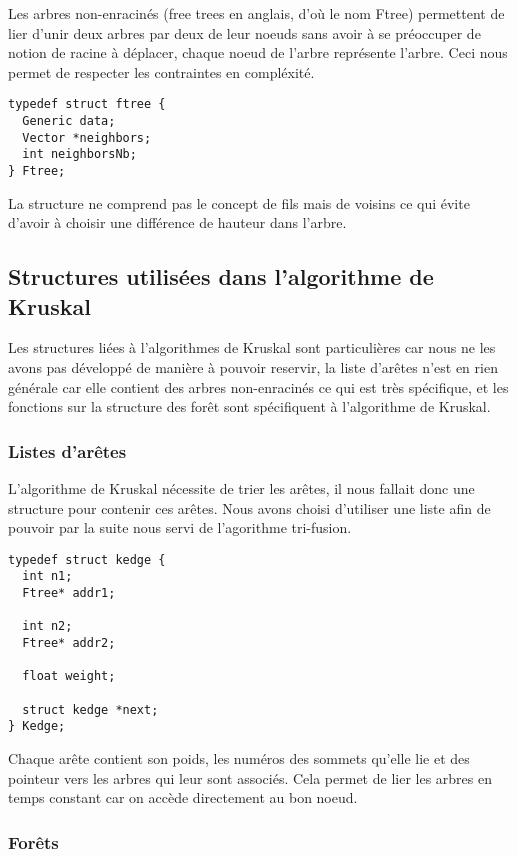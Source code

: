 \documentclass[a4paper]{article}
\begin{document}
Les arbres non-enracinés (free trees en anglais, d'où le nom Ftree) permettent de lier d'unir deux arbres par deux de leur noeuds sans avoir à se préoccuper de notion de racine à déplacer, chaque noeud de l'arbre représente l'arbre. Ceci nous permet de respecter les contraintes en compléxité. 

\begin{verbatim}
typedef struct ftree {
  Generic data;
  Vector *neighbors;
  int neighborsNb;
} Ftree;
\end{verbatim}

La structure ne comprend pas le concept de fils mais de voisins ce qui évite d'avoir à choisir une différence de hauteur dans l'arbre.

\subsection{Structures utilisées dans l'algorithme de Kruskal}

Les structures liées à l'algorithmes de Kruskal sont particulières car nous ne les avons pas développé de manière à pouvoir reservir, la liste d'arêtes n'est en rien générale car elle contient des arbres non-enracinés ce qui est très spécifique, et les fonctions sur la structure des forêt sont spécifiquent à l'algorithme de Kruskal.

\subsubsection{Listes d'arêtes}

L'algorithme de Kruskal nécessite de trier les arêtes, il nous fallait donc une structure pour contenir ces arêtes. Nous avons choisi d'utiliser une liste afin de pouvoir par la suite nous servi de l'agorithme tri-fusion.

\begin{verbatim}
typedef struct kedge {
  int n1;
  Ftree* addr1;

  int n2;
  Ftree* addr2;

  float weight;

  struct kedge *next;
} Kedge;
\end{verbatim}

Chaque arête contient son poids, les numéros des sommets qu'elle lie et des pointeur vers les arbres qui leur sont associés. Cela permet de lier les arbres en temps constant car on accède directement au bon noeud.

\subsubsection{Forêts}
\end{document}

